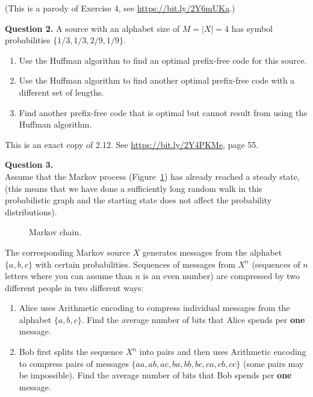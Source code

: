 \documentclass[jou]{apa6}
\begin{document}
(This is a parody of Exercise 4, see \url{https://bit.ly/2Y6mUKa}.)



\vspace{10pt}
{\bf Question 2.} 
A source with an alphabet size of $M = |X| = 4$ has symbol probabilities $\{1/3, 1/3, 2/9, 1/9\}$.
 
\begin{enumerate}
\item Use the Huffman algorithm to find an optimal prefix-free code for this source.
\item Use the Huffman algorithm to find another optimal prefix-free code with a different set
of lengths.
\item Find another prefix-free code that is optimal but cannot result from using the Huffman
algorithm. 
\end{enumerate}

This is an exact copy of 2.12. See \url{https://bit.ly/2Y4PKMe}, page 55.


\vspace{10pt}
{\bf Question 3.}\\
Assume that the Markov process (Figure~\ref{fig:markov-chain}) has already reached a steady state,
(this means that we have done a sufficiently long random walk in this probabilistic graph and the 
starting state does not affect the probability distributions).

\begin{figure}[!htb]
\caption{\label{fig:markov-chain} Markov chain.}
\end{figure}


The corresponding Markov source $X$ generates messages from the alphabet $\{a, b, c\}$
with certain probabilities. Sequences of messages from $X^n$ (sequences of $n$ letters where you 
can assume than $n$ is an even number) are compressed 
by two different people in two different ways:
\begin{enumerate}
\item Alice uses Arithmetic encoding to compress individual messages from the alphabet $\{a, b, c\}$. 
Find the average number of bits that Alice spends per {\bf one} message.
\item Bob first splits the sequence $X^n$ into pairs and then 
uses Arithmetic encoding to compress pairs of messages $\{aa, ab, ac, ba, bb, bc, ca,cb,cc\}$
(some pairs may be impossible). 
Find the average number of bits that Bob spends per {\bf one} message.
\end{enumerate}
\end{document}
